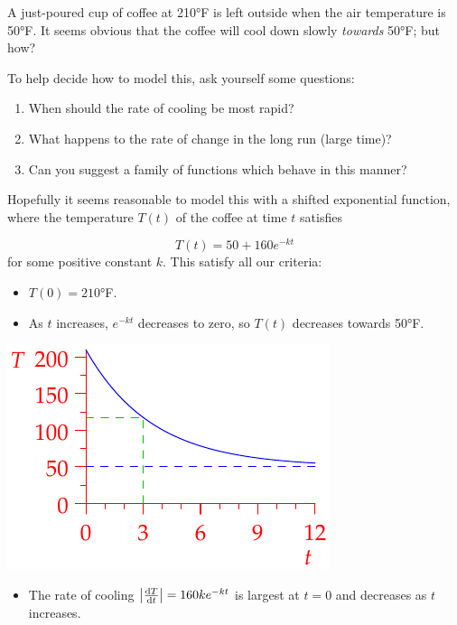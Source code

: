 
A just-poured cup of coffee at \ang{210}F is left outside when the air temperature is \ang{50}F. It seems obvious that the coffee will cool down slowly \emph{towards} \ang{50}F; but how?\smallbreak

To help decide how to model this, ask yourself some questions:

\begin{enumerate}
  \item When should the rate of cooling be most rapid?
  \item What happens to the rate of change in the long run (large time)?
  \item Can you suggest a family of functions which behave in this manner?
\end{enumerate}


Hopefully it seems reasonable to model this with a shifted exponential function, where  the temperature $T(t)$ of the coffee at time $t$ satisfies\par
\begin{minipage}[t]{0.6\linewidth}\vspace{-8pt}
	\[
		T(t)=50+160e^{-kt}
	\]
	for some positive constant $k$. This satisfy all our criteria:
	\begin{itemize}%
	  \item $T(0)=\ang{210}$F.
	  \item As $t$ increases, $e^{-kt}$ decreases to zero, so $T(t)$ decreases towards \ang{50}F.
	\end{itemize}
\end{minipage}
\hfill
\begin{minipage}[t]{0.39\linewidth}\vspace{-15pt}
	\hfill\includegraphics{coffee}
\end{minipage}\par
\begin{itemize}
  \item The rate of cooling $\smash[t]{\nm{\diff[T]{t}}}=160ke^{-kt}$ is largest at $t=0$ and decreases as $t$ increases. 
\end{itemize}

